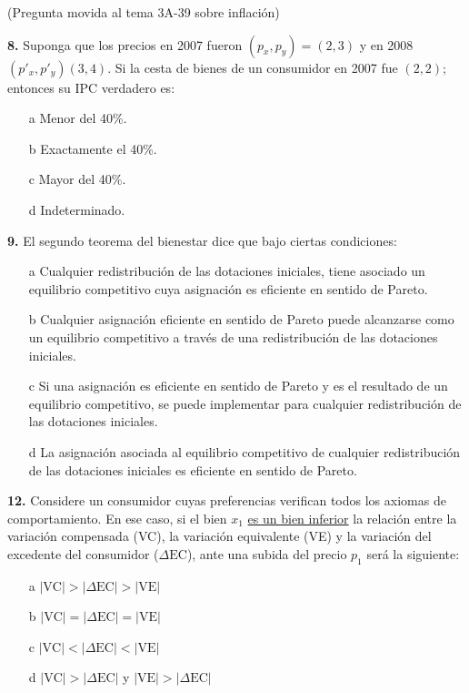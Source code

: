 \documentclass{nuevotema}
\begin{document}

(Pregunta movida al tema 3A-39 sobre inflación)

\textbf{8.} Suponga que los precios en 2007 fueron $(p_x, p_y) = (2,3)$ y en 2008 $(p'_x, p'_y) (3,4)$. Si la cesta de bienes de un consumidor en 2007 fue $(2,2)$; entonces su IPC verdadero es:

\begin{itemize}
	\item[a] Menor del 40\%.
	\item[b] Exactamente el 40\%.
	\item[c] Mayor del 40\%.
	\item[d] Indeterminado.
\end{itemize}


\textbf{9.} El segundo teorema del bienestar dice que bajo ciertas condiciones:

\begin{itemize}
	\item[a] Cualquier redistribución de las dotaciones iniciales, tiene asociado un equilibrio competitivo cuya asignación es eficiente en sentido de Pareto.
	\item[b] Cualquier asignación eficiente en sentido de Pareto puede alcanzarse como un equilibrio competitivo a través de una redistribución de las dotaciones iniciales.
	\item[c] Si una asignación es eficiente en sentido de Pareto y es el resultado de un equilibrio competitivo, se puede implementar para cualquier redistribución de las dotaciones iniciales.
	\item[d] La asignación asociada al equilibrio competitivo de cualquier redistribución de las dotaciones iniciales es eficiente en sentido de Pareto.
\end{itemize}


\textbf{12.} Considere un consumidor cuyas preferencias verifican todos los axiomas de comportamiento. En ese caso, si el bien $x_1$ \underline{es un bien inferior} la relación entre la variación compensada (VC), la variación equivalente (VE) y la variación del excedente del consumidor ($\Delta \text{EC}$), ante una subida del precio $p_1$ será la siguiente:

\begin{itemize}
	\item[a] $|\text{VC}| > |\Delta \text{EC} | > |\text{VE} |$
	\item[b] $| \text{VC}| = |\Delta \text{EC}| = |\text{VE}| $
	\item[c] $| \text{VC}| < |\Delta \text{EC}| < |\text{VE}| $
	\item[d] $|\text{VC}| > |\Delta \text{EC}| $ y $|\text{VE}| > |\Delta \text{EC}|$
\end{itemize}
\end{document}
